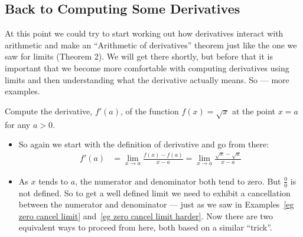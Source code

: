 \subsection*{Back to Computing Some Derivatives}



At this point we could try to start working out how derivatives interact with
arithmetic and make an ``Arithmetic of derivatives'' theorem just like the one
we saw for limits (Theorem 2). We will get there
shortly, but before that it is important that we become more comfortable with
computing derivatives using limits and then understanding what the derivative actually
means. So --- more examples.

\begin{eg}\label{eg:DIFFderivXsqrt}
Compute the derivative, $f'(a)$, of the function $f(x)=\sqrt{x}$ at the point
$x=a$ for any $a> 0$.

\begin{itemize}
 \item So again we start with the definition of derivative and go from there:
\begin{align*}
f'(a)
&=\lim_{x\rightarrow a}\frac{f(x)-f(a)}{x-a}
 =\lim_{x\rightarrow a}\frac{\sqrt{x}-\sqrt{a}}{x-a}
\end{align*}
\item As $x$ tends to $a$, the numerator and denominator both tend to zero.
But $\tfrac{0}{0}$ is not defined. So to get a well defined limit we need
to exhibit a cancellation between the numerator and denominator ---
just as we saw in Examples~\ref{eg zero cancel limit} and~\ref{eg zero cancel limit
harder}. Now there are two equivalent ways to proceed from here, both based on a similar
``trick''.


\end{itemize}
\end{eg}
